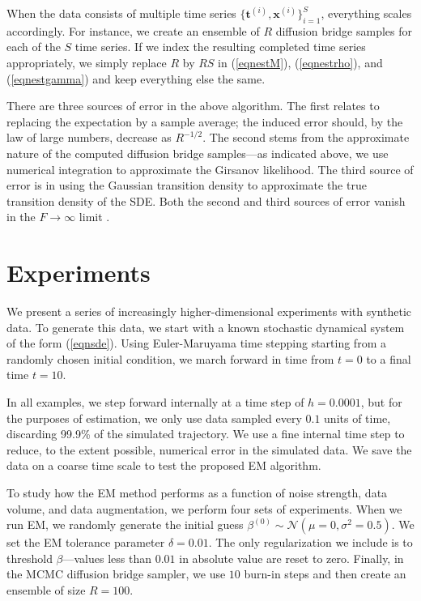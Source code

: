 \documentclass{article}
\newcommand{\bx}{\ensuremath{\mathbf{x}}}
\newcommand{\bt}{\ensuremath{\mathbf{t}}}
\begin{document}
When the data consists of multiple time series $\{ \bt^{(i)}, \bx^{(i)} \}_{i=1}^S$, everything scales accordingly.  For instance, we create an ensemble of $R$ diffusion bridge samples for each of the $S$ time series.  If we index the resulting completed time series appropriately, we simply replace $R$ by $RS$ in (\ref{eqnestM}), (\ref{eqnestrho}), and (\ref{eqnestgamma}) and keep everything else the same.

There are three sources of error in the above algorithm.  The first relates to replacing the expectation by a sample average; the induced error should, by the law of large numbers, decrease as $R^{-1/2}$.  The second stems from the approximate nature of the computed diffusion bridge samples---as indicated above, we use numerical integration to approximate the Girsanov likelihood.  The third source of error is in using the Gaussian transition density to approximate the true transition density of the SDE.  Both the second and third sources of error vanish in the $F \to \infty$ limit \cite{kloeden_numerical_2011}.

\section{Experiments}
\vspace{-1.5ex}

We present a series of increasingly higher-dimensional experiments with synthetic data.  To generate this data, we start with a known stochastic dynamical system of the form (\ref{eqnsde}).  Using Euler-Maruyama time stepping starting from a randomly chosen initial condition, we march forward in time from $t=0$ to a final time $t=10$. 

In all examples, we step forward internally at a time step of $h = 0.0001$, but for the purposes of estimation, we only use data sampled every $0.1$ units of time, discarding 99.9\% of the simulated trajectory.  We use a fine internal time step to reduce, to the extent possible, numerical error in the simulated data.  We save the data on a coarse time scale to test the proposed EM algorithm.

To study how the EM method performs as a function of noise strength, data volume, and data augmentation, we perform four sets of experiments.  When we run EM, we randomly generate the initial guess $\beta^{(0)} \sim \mathcal{N}(\mu=0, \sigma^2=0.5)$.  We set the EM tolerance parameter $\delta = 0.01$.  The only regularization we include is to threshold $\beta$---values less than $0.01$ in absolute value are reset to zero.  Finally, in the MCMC diffusion bridge sampler, we use $10$ burn-in steps and then create an ensemble of size $R=100$.
\end{document}

